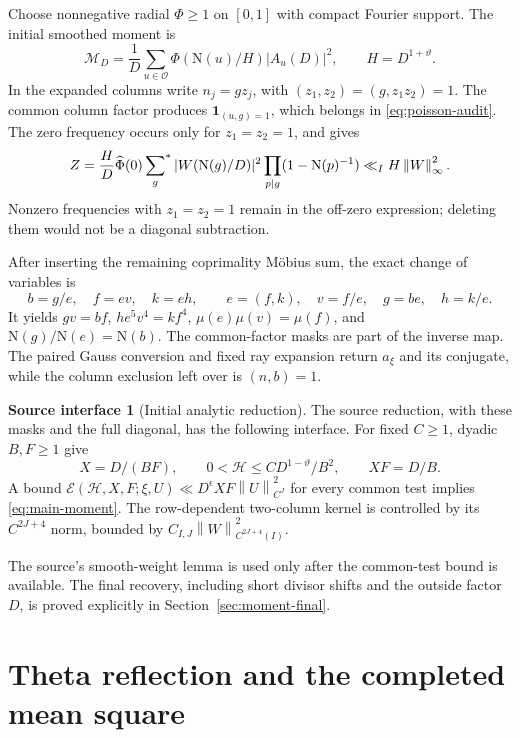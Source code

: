 \documentclass[11pt]{article}
\numberwithin{equation}{section}
\theoremstyle{definition}
\newtheorem{assumption}[theorem]{Source interface}
\theoremstyle{remark}
\newcommand{\OO}{\mathcal O}
\newcommand{\E}{\mathcal E}
\newcommand{\N}{\mathrm N}
\newcommand{\ind}{\mathbf 1}
\newcommand{\norm}[1]{\left\|#1\right\|}
\newcommand{\sfstar}{\sideset{}{^*}\sum}
\begin{document}
Choose nonnegative radial \(\Phi\ge1\) on \([0,1]\) with compact
Fourier support. The initial smoothed moment is
\begin{equation}\label{eq:MD}
 \mathcal M_D=\frac1D\sum_{u\in\OO}\Phi(\N(u)/H)|A_u(D)|^2,
 \qquad H=D^{1+\vartheta}.
\end{equation}
In the expanded columns write \(n_j=gz_j\), with
\((z_1,z_2)=(g,z_1z_2)=1\). The common column factor produces
\(\ind_{(u,g)=1}\), which belongs in \eqref{eq:poisson-audit}.
The zero frequency occurs only for \(z_1=z_2=1\), and gives
\[
 Z=\frac HD\widehat\Phi(0)\sfstar_g |W(\N(g)/D)|^2
       \prod_{p\mid g}(1-\N(p)^{-1})
 \ll_I H\norm{W}_\infty^2.
\]
Nonzero frequencies with \(z_1=z_2=1\) remain in the off-zero
expression; deleting them would not be a diagonal subtraction.

After inserting the remaining coprimality M\"obius sum, the exact
change of variables is
\[
 b=g/e,\quad f=ev,\quad k=eh,\qquad
 e=(f,k),\quad v=f/e,\quad g=be,\quad h=k/e.
\]
It yields \(gv=bf\), \(he^5v^4=kf^4\),
\(\mu(e)\mu(v)=\mu(f)\), and \(\N(g)/\N(e)=\N(b)\).
The common-factor masks are part of the inverse map. The paired
Gauss conversion and fixed ray expansion return \(a_\xi\) and its
conjugate, while the column exclusion left over is \((n,b)=1\).

\begin{assumption}[Initial analytic reduction]\label{in:initial}
The source reduction, with these masks and the full diagonal,
has the following interface. For fixed \(C\ge1\), dyadic \(B,F\ge1\)
give
\begin{equation}\label{eq:initial-ranges}
 X=D/(BF),\qquad
 0<\mathcal H\le CD^{1-\vartheta}/B^2,\qquad
 XF=D/B.
\end{equation}
A bound
\(\E(\mathcal H,X,F;\xi,U)
 \ll D^\epsilon XF\norm{U}_{C^J}^2\)
for every common test implies \eqref{eq:main-moment}.
The row-dependent two-column kernel is controlled by its
\(C^{2J+4}\) norm, bounded by
\(C_{I,J}\norm{W}_{C^{2J+4}(I)}^2\).
\end{assumption}

The source's smooth-weight lemma is used only after the common-test
bound is available. The final recovery, including short divisor shifts
and the outside factor \(D\), is proved explicitly in
Section~\ref{sec:moment-final}.

\section{Theta reflection and the completed mean square}\label{sec:completed}
\end{document}
